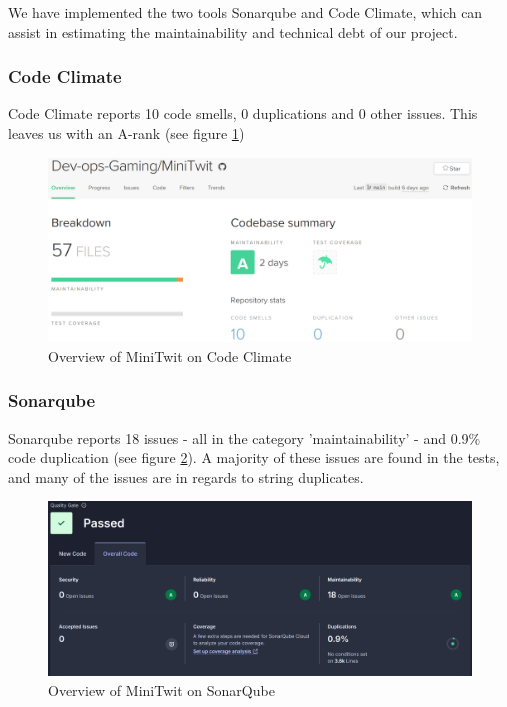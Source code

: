 We have implemented the two tools Sonarqube and Code Climate, which can assist in estimating the maintainability and technical debt of our project.
\subsubsection{Code Climate}
Code Climate reports 10 code smells, 0 duplications and 0 other issues. This leaves us with an A-rank (see figure \ref{fig:CodeClimate})\\
\begin{figure}[h]
\centering
\includegraphics[width=\textwidth]{images/code_climate.png}
\caption{Overview of MiniTwit on Code Climate}
\label{fig:CodeClimate}
\end{figure}

\subsubsection{Sonarqube}
Sonarqube reports 18 issues - all in the category 'maintainability' - and 0.9\% code duplication (see figure \ref{fig:SonarQube}). A majority of these issues are found in the tests, and many of the issues are in regards to string duplicates.
\begin{figure}[h]
\centering
\includegraphics[width=\textwidth]{images/sonarQube.png}
\caption{Overview of MiniTwit on SonarQube}
\label{fig:SonarQube}
\end{figure}